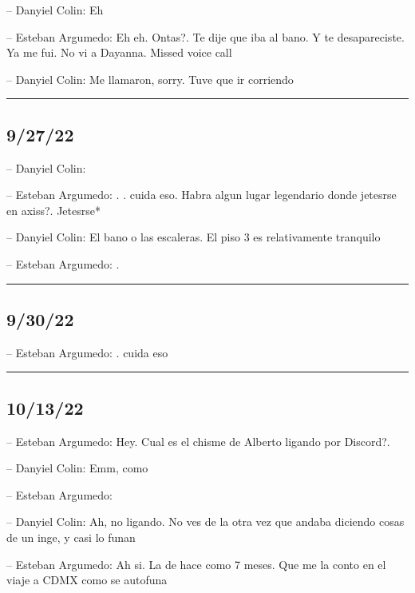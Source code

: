 -- Danyiel Colin: Eh

-- Esteban Argumedo: Eh eh. Ontas?. Te dije que iba al bano. Y te
desapareciste. Ya me fui. No vi a Dayanna. Missed voice call

-- Danyiel Colin: Me llamaron, sorry. Tuve que ir corriendo

\begin{center}\rule{0.5\linewidth}{0.5pt}\end{center}

\hypertarget{section-156}{%
\subsection{9/27/22}\label{section-156}}

-- Danyiel Colin:

-- Esteban Argumedo: . . cuida eso. Habra algun lugar legendario donde
jetesrse en axiss?. Jetesrse*

-- Danyiel Colin: El bano o las escaleras. El piso 3 es relativamente
tranquilo

-- Esteban Argumedo: .

\begin{center}\rule{0.5\linewidth}{0.5pt}\end{center}

\hypertarget{section-157}{%
\subsection{9/30/22}\label{section-157}}

-- Esteban Argumedo: . cuida eso

\begin{center}\rule{0.5\linewidth}{0.5pt}\end{center}

\hypertarget{section-158}{%
\subsection{10/13/22}\label{section-158}}

-- Esteban Argumedo: Hey. Cual es el chisme de Alberto ligando por
Discord?.

-- Danyiel Colin: Emm, como

-- Esteban Argumedo:

-- Danyiel Colin: Ah, no ligando. No ves de la otra vez que andaba
diciendo cosas de un inge, y casi lo funan

-- Esteban Argumedo: Ah si. La de hace como 7 meses. Que me la conto en
el viaje a CDMX como se autofuna

